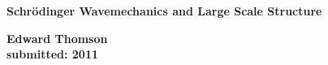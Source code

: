 \thispagestyle{empty}
%
%
\begin{center}
          \LARGE\bf Schr\"odinger Wavemechanics and Large Scale Structure
\end{center}

\begin{center}
        \bf Edward Thomson\\                           %
         submitted:  2011                                   %
\end{center}
